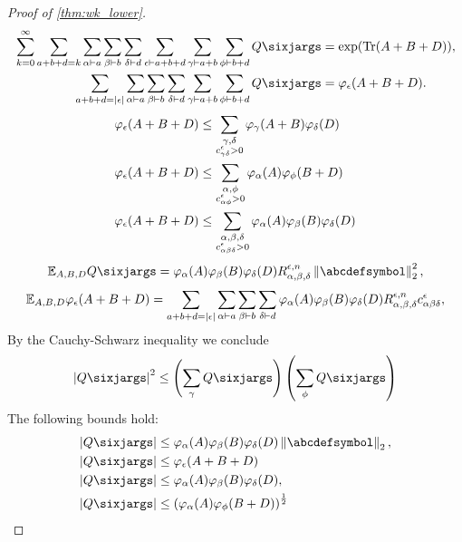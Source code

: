 \documentclass[notitlepage, 10pt]{article}
\begin{document}
\begin{proof}[Proof of \cref{thm:wk_lower}]
\begin{align}
        \sum_{k=0}^{\infty}\sum_{a+b+d=k}\sum_{\ya\vdash a}\sum_{\yb\vdash b}\sum_{\yd \vdash d}\sum_{\ye\vdash a+b+d}\sum_{\yc\vdash a+b}\sum_{\yf\vdash b+d}Q\sixjargs &= \exp(\Tr(A+B+D)), \\
        \sum_{a+b+d={\sye}}\sum_{\ya\vdash a}\sum_{\yb\vdash b}\sum_{\yd \vdash d}\sum_{\yc\vdash a+b}\sum_{\yf\vdash b+d}Q\sixjargs &= \varphi_{\ye}(A+B+D).
    \end{align}
    \begin{align}
        \varphi_{\epsilon}(A+B+D) &\leq \sum_{\substack{\gamma,\delta\\c^{\epsilon}_{\gamma\delta} > 0}} \varphi_{\gamma}(A+B)\varphi_{\delta}(D) \\
        \varphi_{\epsilon}(A+B+D) &\leq \sum_{\substack{\alpha,\phi\\c^{\epsilon}_{\alpha\phi} > 0}} \varphi_{\alpha}(A)\varphi_{\phi}(B+D) \\
        \varphi_{\epsilon}(A+B+D) &\leq \sum_{\substack{\alpha,\beta,\delta\\c^{\epsilon}_{\alpha\beta\delta} > 0}} \varphi_{\alpha}(A)\varphi_{\beta}(B)\varphi_{\delta}(D) \\
    \end{align}
    \begin{equation}
        \mathbb E_{A,B,D}Q\sixjargs = \varphi_{\ya}(A)\varphi_{\yb}(B)\varphi_{\yd}(D) R^{\ye,n}_{\ya,\yb,\yd}\norm{\abcdefsymbol}_2^2,
    \end{equation}
    \begin{equation}
        \mathbb E_{A,B,D}\varphi_{\epsilon}(A+B+D) = \sum_{a+b+d={|\epsilon|}}\sum_{\alpha\vdash a}\sum_{\beta\vdash b}\sum_{\delta \vdash d}\varphi_{\alpha}(A)\varphi_{\beta}(B)\varphi_{\delta}(D) R^{\epsilon,n}_{\alpha,\beta,\delta}c^{\epsilon}_{\alpha\beta\delta},
    \end{equation}
    By the Cauchy-Schwarz inequality we conclude
    \begin{equation}
        \abs{Q\sixjargs}^2 \leq \left(\sum_{\yc}Q\sixjargs\right)\left(\sum_{\yf}Q\sixjargs\right)
    \end{equation}
    The following bounds hold:
    \begin{align}
        \abs{Q\sixjargs} &\leq
        \varphi_{\ya}(A)\varphi_{\yb}(B)\varphi_{\yd}(D) \norm{\abcdefsymbol}_2, \\
        \abs{Q\sixjargs} &\leq
        \varphi_{\ye}(A+B+D) \\
        \abs{Q\sixjargs} &\leq
        \varphi_{\ya}(A)\varphi_{\yb}(B)\varphi_{\yd}(D), \\
        \abs{Q\sixjargs} &\leq
        \left(\varphi_{\ya}(A)\varphi_{\yf}(B+D)\right)^{\frac{1}{2}}

\end{align}
\end{proof}
\end{document}
